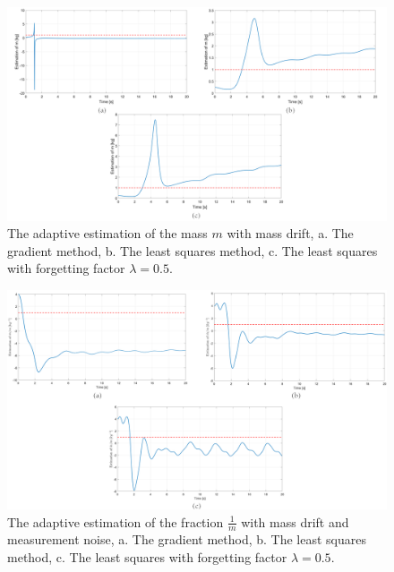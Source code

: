 \documentclass[12pt]{article}
\begin{document}
\begin{figure}[!h]
	\includegraphics[width=1\columnwidth]{figures/driftMass_m.png}
	\centering
	\caption{The adaptive estimation of the mass $m$ with mass drift, a. The gradient method, b. The least squares method, c. The least squares with forgetting factor $\lambda=0.5$.}
	\label{fig_noiseDrift_m}
\end{figure}


\begin{figure}[!h]
	\includegraphics[width=.95\columnwidth]{figures/noise.png}
	\centering
	\caption{The adaptive estimation of the fraction $\frac{1}{m}$ with mass drift and measurement noise, a. The gradient method, b. The least squares method, c. The least squares with forgetting factor $\lambda=0.5$.}
	\label{fig_noise}
\end{figure}
\end{document}
